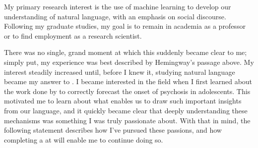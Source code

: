 
My primary research interest is the use of machine learning to develop our understanding of natural language, with an emphasis on social discourse. Following my graduate studies, my goal is to remain in academia as a professor or to find employment as a research scientist.

There was no single, grand moment at which this suddenly became clear to me; simply put, my experience was best described by Hemingway's passage above. My interest steadily increased until, before I knew it, studying natural language became my answer to . I became interested in the field when I first learned about the work done by \cite{bedi2015automated} to correctly forecast the onset of psychosis in adolescents. This motivated me to learn about what enables us to draw such important insights from our language, and it quickly became clear that deeply understanding these mechanisms was something I was truly passionate about. With that in mind, the following statement describes how I've pursued these passions, and how completing a \degree {} at \universityname {}  will enable me to continue doing so.